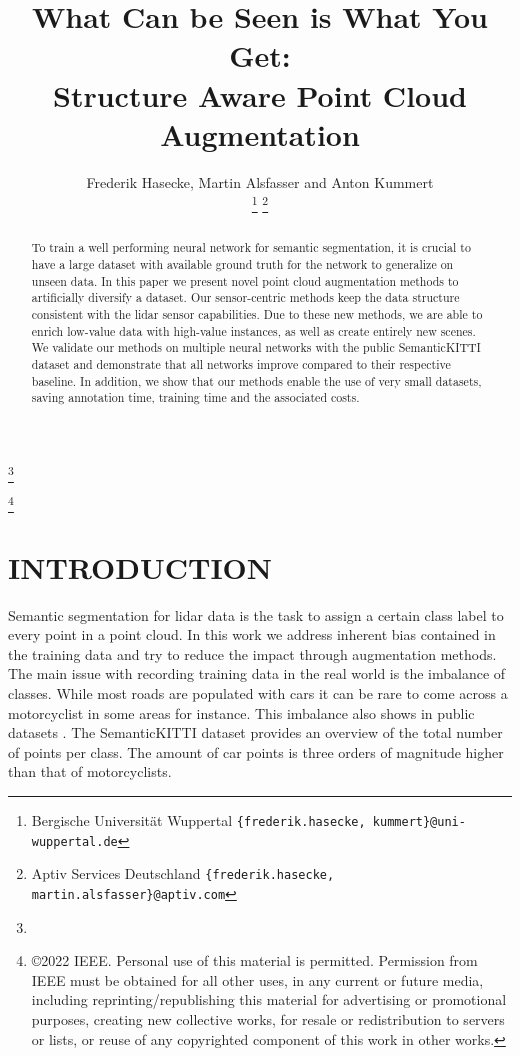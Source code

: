 \documentclass[letterpaper, 10 pt, conference]{ieeeconf}
\title{\LARGE \bf
What Can be Seen is What You Get:\\Structure Aware Point Cloud Augmentation
}
\author{
	Frederik Hasecke,  Martin Alsfasser and Anton Kummert
	
\thanks{ Bergische Universit\"at Wuppertal
        {\tt\small \{frederik.hasecke, kummert\}@uni-wuppertal.de}}
\thanks{ Aptiv Services Deutschland
        {\tt\small \{frederik.hasecke, martin.alsfasser\}@aptiv.com}}}
\newcommand\blfootnote[1]{\begingroup
	\renewcommand\thefootnote{}\footnote{#1}\addtocounter{footnote}{-1}\endgroup
}
\begin{document}
\maketitle
\thispagestyle{empty}
\pagestyle{empty}


\begin{abstract}
To train a well performing neural network for semantic segmentation, it is crucial to have a large dataset with available ground truth for the network to generalize on unseen data.
	In this paper we present novel point cloud augmentation methods to artificially diversify a dataset.
	Our sensor-centric methods keep the data structure consistent with the lidar sensor capabilities. Due to these new methods, we are able to enrich low-value data with high-value instances, as well as create entirely new scenes.
	We validate our methods on multiple neural networks with the public SemanticKITTI \cite{behley2019semantickitti} dataset and demonstrate that all networks improve compared to their respective baseline. 
	In addition, we show that our methods enable the use of very small datasets, saving annotation time, training time and the associated costs.
	
	
\end{abstract}




\blfootnote{}
\blfootnote{\copyright 2022 IEEE. Personal use of this material is permitted. Permission from IEEE must be obtained for all other uses, in any current or future media, including reprinting/republishing this material for advertising or promotional purposes, creating new collective works, for resale or redistribution to servers or lists, or reuse of any copyrighted component of this work in other works.}
\section{INTRODUCTION}
\label{section:intro}
Semantic segmentation for lidar data is the task to assign a certain class label to every point in a point cloud. 
In this work we address inherent bias contained in the training data and try to reduce the impact through augmentation methods.
The main issue with recording training data in the real world is the imbalance of classes. While most roads are populated with cars it can be rare to come across a motorcyclist in some areas for instance. This imbalance also shows in public datasets \cite{behley2019semantickitti}\cite{caesar2020nuscenes}. The SemanticKITTI \cite{behley2019semantickitti} dataset provides an overview of the total number of points per class. The amount of car points is three orders of magnitude higher than that of motorcyclists. 
\end{document}
